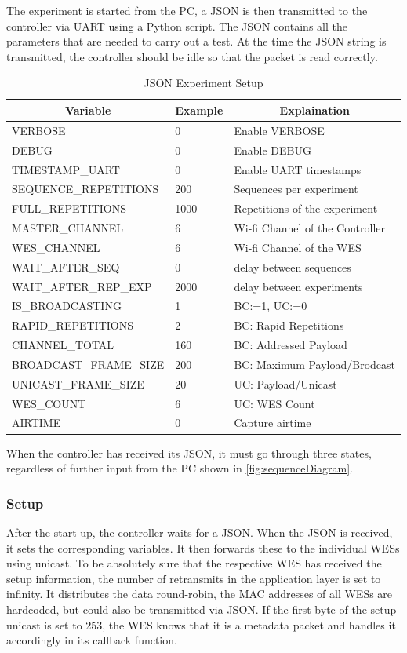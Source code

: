 The experiment is started from the PC, a JSON is then transmitted to the controller via \ac{UART} using a Python script.
The JSON contains all the parameters that are needed to carry out a test.
At the time the JSON string is transmitted, the controller should be idle so that the packet is read correctly.

\begin{table}[h]
	\centering
	\begin{tabular} { lll }
	\toprule
	\multicolumn{1}{c}{Variable}
	& \multicolumn{1}{c}{Example}
	& \multicolumn{1}{c}{Explaination} \\
	\midrule
	VERBOSE               & 0 				& Enable VERBOSE \\
	DEBUG                 & 0 				& Enable DEBUG \\
	TIMESTAMP\_UART       & 0				& Enable UART timestamps \\
	SEQUENCE\_REPETITIONS & 200				& Sequences per experiment \\
	FULL\_REPETITIONS     & 1000			& Repetitions of the experiment \\
	MASTER\_CHANNEL       & 6				& Wi-fi Channel of the Controller \\
	WES\_CHANNEL          & 6				& Wi-fi Channel of the WES \\
	WAIT\_AFTER\_SEQ      & 0				& delay between sequences \\
	WAIT\_AFTER\_REP\_EXP & 2000			& delay between experiments \\
	IS\_BROADCASTING      & 1				& BC:=1, UC:=0 \\
	RAPID\_REPETITIONS     & 2				& BC: Rapid Repetitions \\
	CHANNEL\_TOTAL        & 160	 			& BC: Addressed Payload \\
	BROADCAST\_FRAME\_SIZE& 200 			& BC: Maximum Payload/Brodcast \\
	UNICAST\_FRAME\_SIZE  & 20				& UC: Payload/Unicast \\
	WES\_COUNT            & 6				& UC: WES Count \\
	AIRTIME               & 0				& Capture airtime\\
	\bottomrule
	\end{tabular}
	\caption{JSON Experiment Setup}
	\label{tab:json}
\end{table}

When the controller has received its JSON, it must go through three states, 
regardless of further input from the PC shown in \cref{fig:sequenceDiagram}.
\subsubsection*{Setup}
After the start-up, the controller waits for a JSON. When the JSON is received, it sets the corresponding variables.
It then forwards these to the individual WESs using unicast. 
To be absolutely sure that the respective WES has received the setup information,
the number of retransmits in the application layer is set to infinity.
It distributes the data round-robin, the MAC addresses of all WESs are hardcoded, but could also be transmitted via JSON.
If the first byte of the setup unicast is set to 253, the WES knows that it is a metadata packet and handles it accordingly in its callback function.

